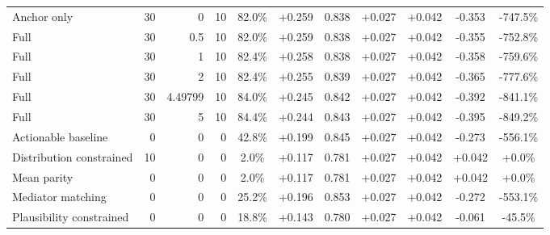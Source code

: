 \begin{table}[htbp]
\begin{tabular}{lrrrccccccc}
Anchor only & 30 & 0 & 10 & 82.0\% & +0.259 & 0.838 & +0.027 & +0.042 & -0.353 & -747.5\% \\
Full & 30 & 0.5 & 10 & 82.0\% & +0.259 & 0.838 & +0.027 & +0.042 & -0.355 & -752.8\% \\
Full & 30 & 1 & 10 & 82.4\% & +0.258 & 0.838 & +0.027 & +0.042 & -0.358 & -759.6\% \\
Full & 30 & 2 & 10 & 82.4\% & +0.255 & 0.839 & +0.027 & +0.042 & -0.365 & -777.6\% \\
Full & 30 & 4.49799 & 10 & 84.0\% & +0.245 & 0.842 & +0.027 & +0.042 & -0.392 & -841.1\% \\
Full & 30 & 5 & 10 & 84.4\% & +0.244 & 0.843 & +0.027 & +0.042 & -0.395 & -849.2\% \\
Actionable baseline & 0 & 0 & 0 & 42.8\% & +0.199 & 0.845 & +0.027 & +0.042 & -0.273 & -556.1\% \\
Distribution constrained & 10 & 0 & 0 & 2.0\% & +0.117 & 0.781 & +0.027 & +0.042 & +0.042 & +0.0\% \\
Mean parity & 0 & 0 & 0 & 2.0\% & +0.117 & 0.781 & +0.027 & +0.042 & +0.042 & +0.0\% \\
Mediator matching & 0 & 0 & 0 & 25.2\% & +0.196 & 0.853 & +0.027 & +0.042 & -0.272 & -553.1\% \\
Plausibility constrained & 0 & 0 & 0 & 18.8\% & +0.143 & 0.780 & +0.027 & +0.042 & -0.061 & -45.5\% \\
\bottomrule
\end{tabular}
\end{table}